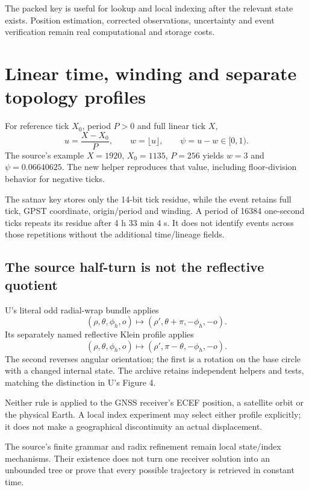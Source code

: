 The packed key is useful for lookup and local indexing after the relevant state exists.
Position estimation, corrected observations, uncertainty and event verification remain
real computational and storage costs.
\clearpage

\section{Linear time, winding and separate topology profiles}
For reference tick $X_0$, period $P>0$ and full linear tick $X$,
\begin{equation}
u=\frac{X-X_0}{P},\qquad w=\lfloor u\rfloor,\qquad\psi=u-w\in[0,1).
\end{equation}
The source's example $X=1920$, $X_0=1135$, $P=256$ yields $w=3$ and
$\psi=0.06640625$. The new helper reproduces that value, including floor-division
behavior for negative ticks. 

The satnav key stores only the 14-bit tick residue, while the event retains full tick,
GPST coordinate, origin/period and winding. A period of 16384 one-second ticks repeats
its residue after 4 h 33 min 4 s. It does not identify events across those repetitions
without the additional time/lineage fields.

\subsection{The source half-turn is not the reflective quotient}
U's literal odd radial-wrap bundle applies
\begin{equation}
(\rho,\theta,\phi_h,o)\mapsto(\rho',\theta+\pi,-\phi_h,-o).
\end{equation}
Its separately named reflective Klein profile applies
\begin{equation}
(\rho,\theta,\phi_h,o)\mapsto(\rho',\pi-\theta,-\phi_h,-o).
\end{equation}
The second reverses angular orientation; the first is a rotation on the base circle
with a changed internal state. The archive retains independent helpers and tests,
matching the distinction in U's Figure 4. 

Neither rule is applied to the GNSS receiver's ECEF position, a satellite orbit or the
physical Earth. A local index experiment may select either profile explicitly; it does
not make a geographical discontinuity an actual displacement. 

The source's finite grammar and radix refinement remain local state/index mechanisms.
Their existence does not turn one receiver solution into an unbounded tree or prove
that every possible trajectory is retrieved in constant time.
\clearpage


